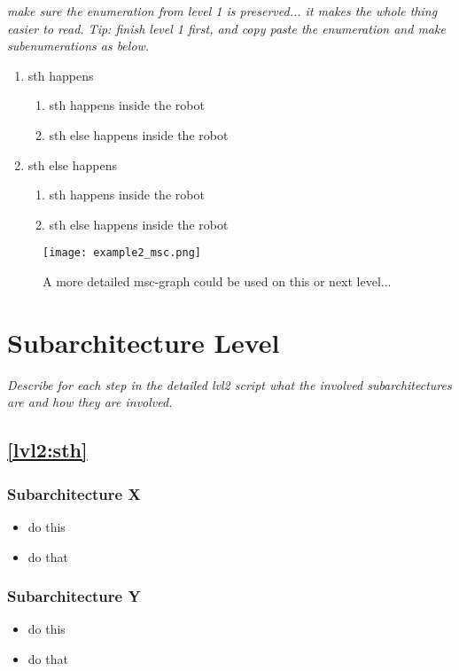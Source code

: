 \documentclass{article}
\begin{document}
\textit{
  make sure the enumeration from level 1 is preserved... it makes the
  whole thing easier to read. Tip: finish level 1 first, and copy
  paste the enumeration and make subenumerations as below.}

\begin{enumerate}
\item \label{lvl2:sth}
  sth happens
\begin{enumerate}
\item \label{lvl2:sth:detail}
    sth happens inside the robot
\item \label{lvl2:sth:detail2}
    sth else happens inside the robot
\end{enumerate}
\item \label{lvl2:sth2}
  sth else happens
\begin{enumerate}
\item \label{lvl2:sth2:detail}
    sth happens inside the robot
\item \label{lvl2:sth2:detail2}
    sth else happens inside the robot
\end{enumerate}
\end{enumerate}

\begin{figure}[ht]
\centering
\texttt{[image: example2\_msc.png]}
\caption{
A more detailed msc-graph could be used on this or next level...
}
\label{fig:lvl2}
\end{figure}

\section{Subarchitecture Level}
\textit{
  Describe for each step in the detailed lvl2 script what the involved
  subarchitectures are and how they are involved.}

\subsection{\ref{lvl2:sth}}
\subsubsection{Subarchitecture X}
\begin{itemize}
\item do this
\item do that
\end{itemize}

\subsubsection{Subarchitecture Y}
\begin{itemize}
\item do this
\item do that
\end{itemize}
\end{document}
